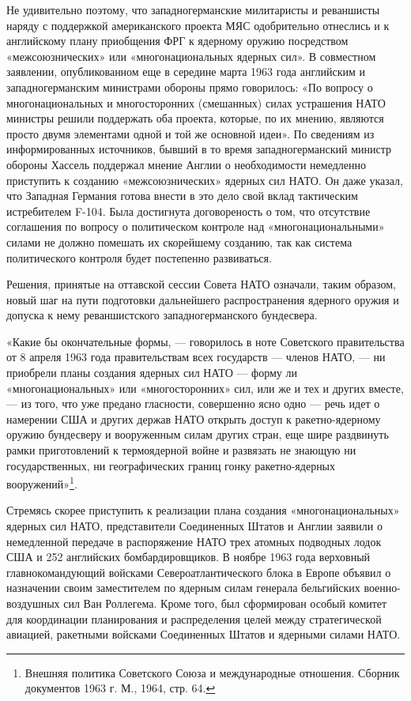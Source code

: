 \documentclass[12pt, a4paper, openany]{book}
\begin{document}
Не удивительно поэтому, что западногерманские милитаристы и реваншисты наряду с поддержкой американского проекта МЯС одобрительно отнеслись и к английскому плану приобщения ФРГ к ядерному оружию посредством «межсоюзнических» или «многонациональных ядерных сил». В совместном заявлении, опубликованном еще в середине марта 1963 года английским и западногерманским министрами обороны прямо говорилось: «По вопросу о многонациональных и многосторонних (смешанных) силах устрашения НАТО министры решили поддержать оба проекта, которые, по их мнению, являются просто двумя элементами одной и той же основной идеи». По сведениям из информированных источников, бывший в то время западногерманский министр обороны Хассель поддержал мнение Англии о необходимости немедленно приступить к созданию «межсоюзнических» ядерных сил НАТО. Он даже указал, что Западная Германия готова внести в это дело свой вклад тактическим истребителем F-104. Была достигнута договореность о том, что отсутствие соглашения по вопросу о политическом контроле над «многонациональными» силами не должно помешать их скорейшему созданию, так как система политического контроля будет постепенно развиваться.
	

Решения, принятые на оттавской сессии Совета НАТО означали, таким образом, новый шаг на пути подготовки дальнейшего распространения ядерного оружия и допуска к нему реваншистского западногерманского бундесвера.

«Какие бы окончательные формы, — говорилось в ноте Советского правительства от 8 апреля 1963 года правительствам всех государств — членов НАТО, — ни приобрели планы создания ядерных сил НАТО — форму ли «многонациональных» или «многосторонних» сил, или же и тех и других вместе, — из того, что уже предано гласности, совершенно ясно одно — речь идет о намерении США и других держав НАТО открыть доступ к ракетно-ядерному оружию бундесверу и вооруженным силам других стран, еще шире раздвинуть рамки приготовлений к термоядерной войне и развязать не знающую ни государственных, ни географических границ гонку ракетно-ядерных вооружений»{\footnote{Внешняя политика Советского Союза и международные отношения. Сборник документов 1963 г. М., 1964, стр. 64.}}.

	
	Стремясь скорее приступить к реализации плана создания «многонациональных» ядерных сил НАТО, представители Соединенных Штатов и Англии заявили о немедленной передаче в распоряжение НАТО трех атомных подводных лодок США и 252 английских бомбардировщиков. В ноябре 1963 года верховный главнокомандующий войсками Североатлантического блока в Европе объявил о назначении своим заместителем по ядерным силам генерала бельгийских военно-воздушных сил Ван Роллегема. Кроме того, был сформирован особый комитет для координации планирования и распределения целей между стратегической авиацией, ракетными войсками Соединенных Штатов и ядерными силами НАТО.
	
\end{document}
